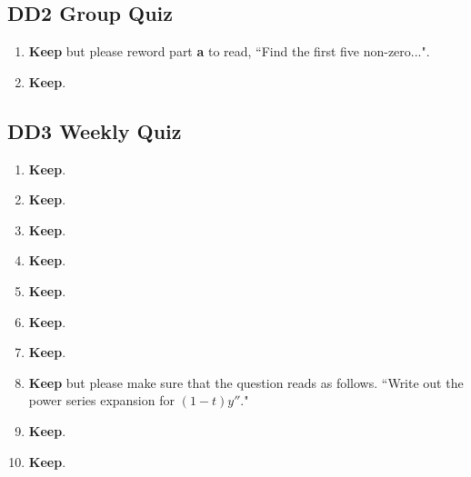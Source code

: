 \documentclass[11pt]{article}
\begin{document}
\subsection*{DD2 Group Quiz}

\begin{enumerate}
	\item \textbf{Keep} but please reword part \textbf{\textup{a}} to read, ``Find the first five non-zero...".
	\item \textbf{Keep}.
\end{enumerate}

\subsection*{DD3 Weekly Quiz}

\begin{enumerate}
	\item \textbf{Keep}.
	\item \textbf{Keep}.
	\item \textbf{Keep}.
	\item \textbf{Keep}.
	\item \textbf{Keep}.
	\item \textbf{Keep}.
	\item \textbf{Keep}.
	\item \textbf{Keep} but please make sure that the question reads as follows. ``Write out the power series expansion for $(1-t)y''$."
	\item \textbf{Keep}.
	\item \textbf{Keep}.
\end{enumerate}
\end{document}
